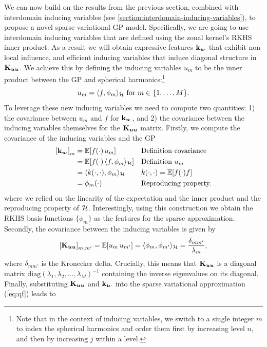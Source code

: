 We can now build on the results from the previous section, combined with interdomain inducing variables (see \cref{section:interdomain-inducing-variables}), to propose a novel sparse variational GP model. Specifically, we are going to use interdomain inducing variables that are defined using the zonal kernel's RKHS inner product. As a result we will obtain expressive features $\mathbf{k}_{\bm{u} \cdot}$ that exhibit non-local influence, and efficient inducing variables that induce diagonal structure in $\mathbf{{K}}_{\bm{u} \bm{u}}$. We achieve this by defining the inducing variables $u_m$ to be the inner product between the GP and spherical harmonics:\footnote{Note that in the context of inducing variables, we switch to a single integer $m$ to index the spherical harmonics and order them first by increasing level $n$, and then by increasing $j$ within a level.}
\begin{equation}
  u_m = \langle f, \phi_m\rangle_{{\mathcal{H}}}\text{ for }m \in \{1, \ldots, M\}.
\end{equation}
To leverage these new inducing variables we need to compute two quantities: 1) the covariance between $u_m$ and $f$ for $\mathbf{k}_{\bm{u} \cdot}$, and 2) the covariance between the inducing variables themselves for the $\mathbf{{K}}_{\bm{u} \bm{u}}$ matrix. Firstly, we compute the covariance of the inducing variables and the GP
\begin{align}
   \left[\kux \right]_m 
    &= \ExpSymb[f(\cdot)\,u_m] && \text{Definition covariance} \\
    &= \ExpSymb[f(\cdot)\,\langle f, \sh_m\rangle_{\rkhs}] && \text{Definition $u_m$} \\
    &= \langle k(\cdot, \cdot), \sh_m \rangle_{\rkhs}   && {k(\cdot, \cdot) = \ExpSymb[f(\cdot) f]} \\
    &= \phi_{m}(\cdot) && \text{Reproducing property.}
\end{align}
where we relied on the linearity of the expectation and the inner product and the reproducing property of ${\mathcal{H}}$. Interestingly, using this construction we obtain the RKHS basis functions $\{\phi_m\}$ as the features for the sparse approximation. Secondly, the covariance between the inducing variables is given by
\begin{equation}
    \left[\Kuu \right]_{m, m'} = \ExpSymb \left[u_m\,u_{m'} \right] 
    = \langle \sh_{m}, \sh_{m'} \rangle_{\rkhs} 
    = {\delta_{mm'} \over \lambda_m},
\end{equation}
where $\delta_{mm'}$ is the Kronecker delta. Crucially, this means that $\mathbf{{K}}_{\bm{u} \bm{u}}$ is a diagonal matrix $\textrm{diag}(\lambda_1, \lambda_2, \ldots, \lambda_M)^{-1}$ containing the inverse eigenvalues on its diagonal. Finally, substituting $\mathbf{{K}}_{\bm{u} \bm{u}}$ and $\mathbf{k}_{\bm{u} \cdot}$ into the sparse variational approximation (\cref{eq:qf}) leads to
